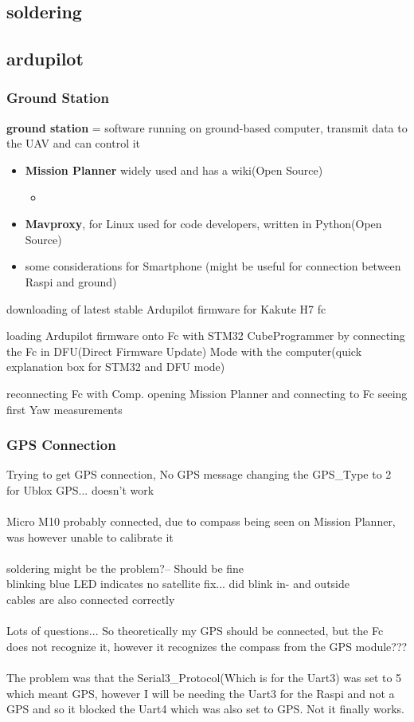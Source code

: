 \documentclass{article}
\begin{document}
	\subsection{soldering}
	
	\subsection{ardupilot}
	\subsubsection{Ground Station}
	\textbf{ground station} = software running on ground-based computer, transmit data to the UAV and can control it
	\begin{itemize}
		\item \textbf{Mission Planner} widely used and has a wiki(Open Source)
		\begin{itemize}
			\item 
		\end{itemize}
		\item \textbf{Mavproxy}, for Linux used for code developers, written in Python(Open Source)
		\item some considerations for Smartphone (might be useful for connection between Raspi and ground)
	\end{itemize}
	downloading of latest stable Ardupilot firmware for Kakute H7 fc	
	
	loading Ardupilot firmware onto Fc with STM32 CubeProgrammer by connecting the Fc in DFU(Direct Firmware Update) Mode with the computer(quick explanation box for STM32 and DFU mode)
	
	reconnecting Fc with Comp. 
	opening Mission Planner and connecting to Fc seeing first Yaw measurements 
	\subsubsection{GPS Connection}
	
	Trying to get GPS connection, No GPS message
	changing the GPS\_Type to 2 for Ublox GPS... doesn't work
	\\
	\\ Micro M10 probably connected, due to compass being seen on Mission Planner, was however unable to calibrate it
	\\
	\\ soldering might be the problem?-- Should be fine
	\\ blinking blue LED indicates no satellite fix... did blink in- and outside
	\\ cables are also connected correctly
	\\
	\\ Lots of questions... So theoretically my GPS should be connected, but the Fc does not recognize it, however it recognizes the compass from the GPS module???
	\\
	\\ The problem was that the Serial3\_Protocol(Which is for the Uart3) was set to 5 which meant GPS, however I will be needing the Uart3 for the Raspi and not a GPS and so it blocked the Uart4 which was also set to GPS. Not it finally works.
\end{document}

